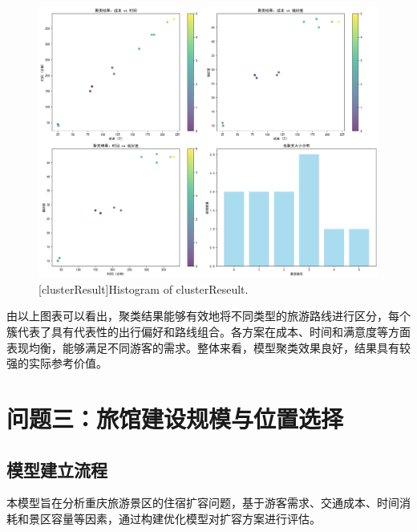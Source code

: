 \begin{figure}[h]
\centering
{}
\includegraphics[width=1.0\columnwidth]{figures/tourism_optimization_clusters.png}
[clusterResult]{Histogram of clusterReseult.}
\label{figure3: cluster}
\end{figure}


由以上图表可以看出，聚类结果能够有效地将不同类型的旅游路线进行区分，每个簇代表了具有代表性的出行偏好和路线组合。各方案在成本、时间和满意度等方面表现均衡，能够满足不同游客的需求。整体来看，模型聚类效果良好，结果具有较强的实际参考价值。






\section[\hspace{-2pt}问题三：旅馆建设规模与位置选择]{{\heiti{} \hspace{-8pt}问题三：旅馆建设规模与位置选择}}\label{section4: 问题3：旅馆建设规模与位置选择}

\subsection[\hspace{-2pt}模型建立流程]{{\heiti{}\hspace{-8pt}模型建立流程}}\label{subsec:3-model-build}


本模型旨在分析重庆旅游景区的住宿扩容问题，基于游客需求、交通成本、时间消耗和景区容量等因素，通过构建优化模型对扩容方案进行评估。

